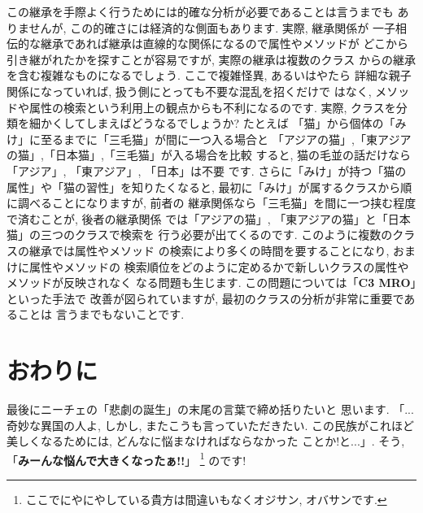 この継承を手際よく行うためには的確な分析が必要であることは言うまでも
ありませんが, この的確さには経済的な側面もあります. 実際, 継承関係が
一子相伝的な継承であれば継承は直線的な関係になるので属性やメソッドが
どこから引き継がれたかを探すことが容易ですが, 実際の継承は複数のクラス
からの継承を含む複雑なものになるでしょう. ここで複雑怪異, あるいはやたら
詳細な親子関係になっていれば, 扱う側にとっても不要な混乱を招くだけで
はなく, メソッドや属性の検索という利用上の観点からも不利になるのです.
 実際, クラスを分類を細かくしてしまえばどうなるでしょうか?  たとえば
「猫」から個体の「みけ」に至るまでに「三毛猫」が間に一つ入る場合と
「アジアの猫」,「東アジアの猫」,「日本猫」,「三毛猫」が入る場合を比較
すると, 猫の毛並の話だけなら「アジア」, 「東アジア」, 「日本」は不要
です. さらに「みけ」が持つ「猫の属性」や「猫の習性」を知りたくなると,
 最初に「みけ」が属するクラスから順に調べることになりますが, 前者の
継承関係なら「三毛猫」を間に一つ挟む程度で済むことが, 後者の継承関係
では「アジアの猫」, 「東アジアの猫」と「日本猫」の三つのクラスで検索を
行う必要が出てくるのです. このように複数のクラスの継承では属性やメソッド
の検索により多くの時間を要することになり, おまけに属性やメソッドの
検索順位をどのように定めるかで新しいクラスの属性やメソッドが反映されなく
なる問題も生じます. この問題については「\textbf{C3 MRO}」といった手法で
改善が図られていますが, 最初のクラスの分析が非常に重要であることは
言うまでもないことです.

\section{おわりに}

最後にニーチェの「悲劇の誕生」\cite{悲劇の誕生}の末尾の言葉で締め括りたいと
思います. 「...奇妙な異国の人よ, しかし, またこうも言っていただきたい.
 この民族がこれほど美しくなるためには, どんなに悩まなければならなかった
ことか!と...」. そう, 「\textbf{みーんな悩んで大きくなったぁ!!}」\cite{野坂}
\footnote{ここでにやにやしている貴方は間違いもなくオジサン, オバサンです.}
のです!

